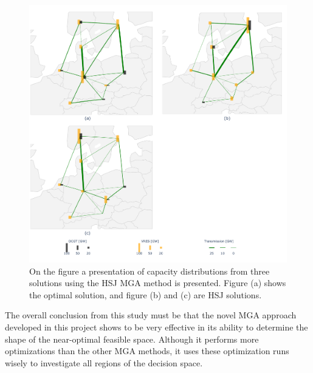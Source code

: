 \begin{figure}[h]\centering
	\includegraphics[width=1.\textwidth,trim={0 0cm 0 0cm},clip]{./Images/HSJ}
	\caption{On the figure a presentation of capacity distributions from three solutions using the HSJ MGA method is presented. Figure (a) shows the optimal solution, and figure (b) and (c) are HSJ solutions. }
	\label{fig:HSJ_results}
\end{figure}

The overall conclusion from this study must be that the novel MGA approach developed in this project shows to be very effective in its ability to determine the shape of the near-optimal feasible space. Although it performs more optimizations than the other MGA methods, it uses these optimization runs wisely to investigate all regions of the decision space. 


